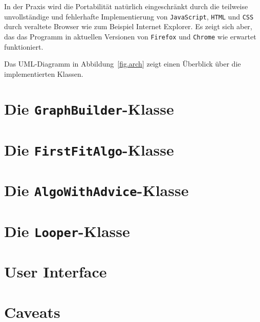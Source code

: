 \documentclass[11pt,abstracton]{scrreprt} %
\theoremstyle{definition}
\begin{document}
In der Praxis wird die Portabilität natürlich eingeschränkt durch die teilweise unvollständige und fehlerhafte Implementierung von {\tt JavaScript}, {\tt HTML} und {\tt CSS} durch veraltete Browser wie zum Beispiel Internet Explorer. Es zeigt sich aber, das das Programm in aktuellen Versionen von {\tt Firefox} und {\tt Chrome} wie erwartet funktioniert.

\bigskip
Das UML-Diagramm in Abbildung~\ref{fig.arch} zeigt einen Überblick über die implementierten Klassen.

\section{Die {\tt GraphBuilder}-Klasse}

\section{Die {\tt FirstFitAlgo}-Klasse}

\section{Die {\tt AlgoWithAdvice}-Klasse}

\section{Die {\tt Looper}-Klasse}

\section{User Interface}

\section{Caveats}




\listoffigures
\listofalgorithms
\end{document}
